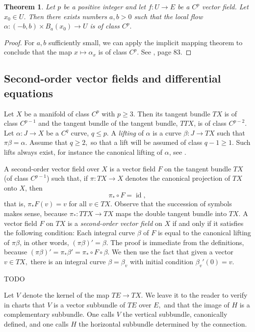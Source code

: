 \documentclass[a5paper,10pt,twoside]{article}
\DeclareMathOperator*{\id}{id}
\theoremstyle{plain}
\newtheorem{teo}{Theorem}[section]
\theoremstyle{definition}
\theoremstyle{remark}
\begin{document}
\begin{teo}
Let $p$ be a positive integer and let $f:U\to E$ be a $C^p$ vector field. Let $x_0\in U$. Then there exists numbers $a,b>0$ such that the local flow $\alpha:(-b,b)\times B_a(x_0)\to U$ is of class $C^p.$
\end{teo}

\begin{proof}
	For $a,b$ sufficiently small, we can apply the implicit mapping theorem to conclude that the map $x\mapsto \alpha_x$ is of class $C^p$. See \cite{lang1999}, page 83.
\end{proof}

\subsection{Second-order vector fields and differential equations}
Let $X$ be a manifold of class $C^p$ with $p\geq 3.$ Then its tangent bundle $TX$ is of class $C^{p-1}$ and the tangent bundle of the tangent bundle, $TTX$, is of class $C^{p-2}$. Let $\alpha:J\to X$ be a $C^q$ curve, $q\leq p.$ A \textit{lifting} of $\alpha$ is a curve $\beta:J\to TX$ such that $\pi\beta=\alpha$. Assume that $q\geq2,$ so that a lift will be assumed of class $q-1\geq 1.$ Such lifts always exist, for instance the canonical lifting of $\alpha$, see \cite{lang1999}.

A second-order vector field over $X$ is a vector field $F$ on the tangent bundle  $TX$ (of class $C^{p-1}$) such that, if $\pi:TX\to X$ denotes the canonical projection of $TX$ onto $X$, then
%
\begin{equation}
\pi_*\circ F = {\id},
\end{equation}
%
that is, $\pi_*F(v)=v$ for all $v\in TX$. Observe that the succession of symbols makes sense, because $\pi_*:TTX\to TX$ maps the double tangent bundle into $TX.$ A vector field $F$ on $TX$ is a \textit{second-order vector field} on $X$ if and only if it
satisfies the following condition: Each integral curve $\beta$ of $F$ is equal to the canonical lifting of $\pi\beta$, in other words, $(\pi\beta)'=\beta.$ The proof is immediate from the definitions,
because $(\pi\beta)'=\pi_*\beta'=\pi_*\circ F\circ \beta$. We then use the fact that given a vector $v\in TX,$ there is an integral curve $\beta=\beta_v$ with initial condition $\beta_v'(0)=v.$

TODO

Let $V$ denote the kernel of the map $TE\to TX.$
We leave it to the reader to verify in charts that $V$ is a vector subbundle of $TE$ over $E,$ and that the image of $H$ is a complementary subbundle. One calls $V$ the vertical subbundle, canonically defined, and one calls $H$ the horizontal subbundle determined by the connection.
\end{document}

